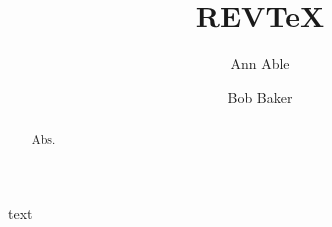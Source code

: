\documentclass[aps,prl]{revtex4-2}
\begin{document}
\title{REVTeX}
\author{Ann Able}
\author{Bob Baker}
\begin{abstract}Abs.\end{abstract}
\maketitle
text
\end{document}
